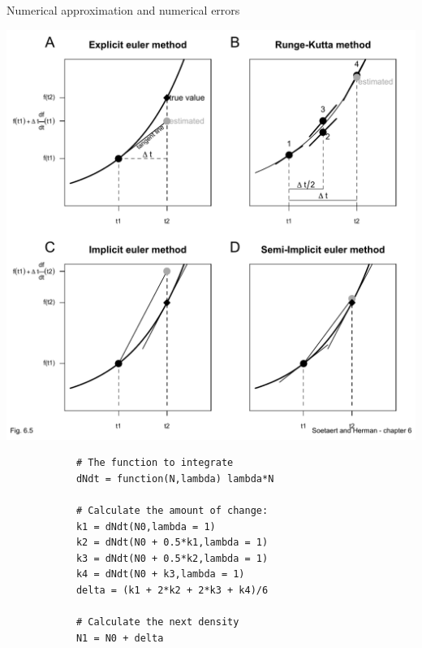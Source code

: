 \documentclass{eecslides}
\begin{document}

	\begin{frame}[fragile]{Numerical approximation and numerical errors}
		\begin{center}
			\includegraphics[height=0.55\textheight]{fig6_5}
		\end{center}
	\end{frame}


	\begin{frame}[fragile]
		
		\begin{lstlisting}
			# The function to integrate
			dNdt = function(N,lambda) lambda*N

			# Calculate the amount of change:
			k1 = dNdt(N0,lambda = 1)
			k2 = dNdt(N0 + 0.5*k1,lambda = 1)
			k3 = dNdt(N0 + 0.5*k2,lambda = 1)
			k4 = dNdt(N0 + k3,lambda = 1)
			delta = (k1 + 2*k2 + 2*k3 + k4)/6

			# Calculate the next density
			N1 = N0 + delta

		\end{lstlisting}

	\end{frame}

\end{document}
